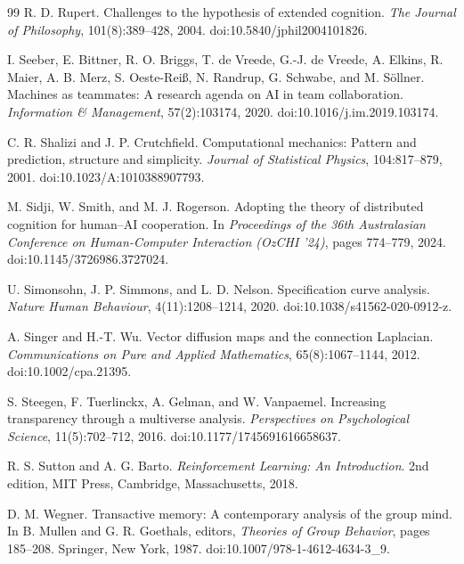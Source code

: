 \documentclass[11pt,letterpaper]{article}
\theoremstyle{plain}
\theoremstyle{definition}
\begin{document}
\begin{thebibliography}{99}
R. D. Rupert.
\newblock Challenges to the hypothesis of extended cognition.
\newblock \emph{The Journal of Philosophy}, 101(8):389--428, 2004.
\newblock doi:10.5840/jphil2004101826.

I. Seeber, E. Bittner, R. O. Briggs, T. de Vreede, G.-J. de Vreede, A. Elkins, R. Maier, A. B. Merz, S. Oeste-Rei\ss, N. Randrup, G. Schwabe, and M. S\"ollner.
\newblock Machines as teammates: A research agenda on AI in team collaboration.
\newblock \emph{Information \& Management}, 57(2):103174, 2020.
\newblock doi:10.1016/j.im.2019.103174.

C. R. Shalizi and J. P. Crutchfield.
\newblock Computational mechanics: Pattern and prediction, structure and simplicity.
\newblock \emph{Journal of Statistical Physics}, 104:817--879, 2001.
\newblock doi:10.1023/A:1010388907793.

M. Sidji, W. Smith, and M. J. Rogerson.
\newblock Adopting the theory of distributed cognition for human--AI cooperation.
\newblock In \emph{Proceedings of the 36th Australasian Conference on Human-Computer Interaction (OzCHI '24)}, pages 774--779, 2024.
\newblock doi:10.1145/3726986.3727024.

U. Simonsohn, J. P. Simmons, and L. D. Nelson.
\newblock Specification curve analysis.
\newblock \emph{Nature Human Behaviour}, 4(11):1208--1214, 2020.
\newblock doi:10.1038/s41562-020-0912-z.

A. Singer and H.-T. Wu.
\newblock Vector diffusion maps and the connection Laplacian.
\newblock \emph{Communications on Pure and Applied Mathematics}, 65(8):1067--1144, 2012.
\newblock doi:10.1002/cpa.21395.

S. Steegen, F. Tuerlinckx, A. Gelman, and W. Vanpaemel.
\newblock Increasing transparency through a multiverse analysis.
\newblock \emph{Perspectives on Psychological Science}, 11(5):702--712, 2016.
\newblock doi:10.1177/1745691616658637.

R. S. Sutton and A. G. Barto.
\newblock \emph{Reinforcement Learning: An Introduction}.
\newblock 2nd edition, MIT Press, Cambridge, Massachusetts, 2018.

D. M. Wegner.
\newblock Transactive memory: A contemporary analysis of the group mind.
\newblock In B. Mullen and G. R. Goethals, editors, \emph{Theories of Group Behavior}, pages 185--208. Springer, New York, 1987.
\newblock doi:10.1007/978-1-4612-4634-3\_9.


\end{thebibliography}
\end{document}
